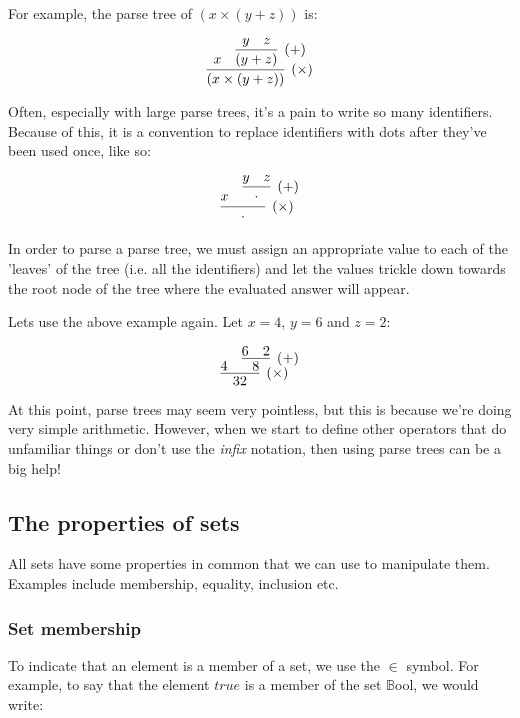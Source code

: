 \documentclass{article}
\newcommand{\parsetreedot}{\phantom{|}\cdot\phantom{|}}
\begin{document}
For example, the parse tree of $(x \times (y + z))$ is:


\[
	\infer[(\times)]{(x \times (y + z))}{
		x
		&
		\infer[(+)]{(y + z)}{
			y
			&
			z
		}
	}
\]

Often, especially with large parse trees, it's a pain to write so many
identifiers. Because of this, it is a convention to replace identifiers with
dots after they've been used once, like so:

\[
	\infer[(\times)]{\parsetreedot} {
		x
		&
		\infer[(+)]{\parsetreedot} {
			y
			&
			z
		}
	}
\]

In order to parse a parse tree, we must assign an appropriate value to each of
the 'leaves' of the tree (i.e. all the identifiers) and let the values trickle
down towards the root node of the tree where the evaluated answer will appear.

Lets use the above example again. Let $x = 4$, $y = 6$ and $z = 2$:

\[
	\infer[(\times)]{32} {
		4
		&
		\infer[(+)]{8} {
			6
			&
			2
		}
	}
\]


At this point, parse trees may seem very pointless, but this is because we're
doing very simple arithmetic. However, when we start to define other operators
that do unfamiliar things or don't use the {\it infix} notation,
then using parse trees can be a big help!

\subsection{The properties of sets}
\label{subsec:properties_of_sets}

All sets have some properties in common that we can use to manipulate them. Examples include membership, equality, inclusion etc.

\subsubsection{Set membership}

To indicate that an element is a member of a set, we use the $\in$ symbol. For example, to say that the element $true$ is a member of the set $\mathbb{B}$ool, we would write:
\end{document}
